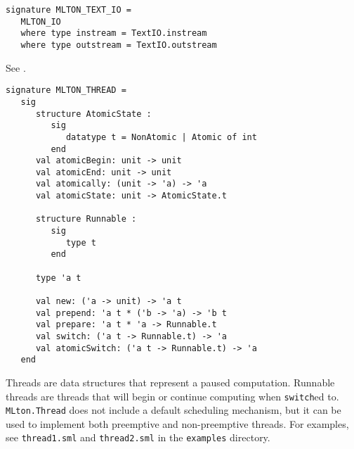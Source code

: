 \begin{verbatim}
signature MLTON_TEXT_IO =
   MLTON_IO
   where type instream = TextIO.instream
   where type outstream = TextIO.outstream
\end{verbatim}

See .


\begin{verbatim}
signature MLTON_THREAD =
   sig
      structure AtomicState :
         sig
            datatype t = NonAtomic | Atomic of int
         end
      val atomicBegin: unit -> unit
      val atomicEnd: unit -> unit
      val atomically: (unit -> 'a) -> 'a
      val atomicState: unit -> AtomicState.t

      structure Runnable :
         sig
            type t
         end

      type 'a t

      val new: ('a -> unit) -> 'a t
      val prepend: 'a t * ('b -> 'a) -> 'b t
      val prepare: 'a t * 'a -> Runnable.t
      val switch: ('a t -> Runnable.t) -> 'a
      val atomicSwitch: ('a t -> Runnable.t) -> 'a
   end
\end{verbatim}

Threads are data structures that represent a paused computation.
Runnable threads are threads that will begin or continue computing when
{\tt switch}ed to.  {\tt MLton.Thread} does not include a default
scheduling mechanism, but it can be used to implement both preemptive
and non-preemptive threads.  For examples, see {\tt thread1.sml} and
{\tt thread2.sml} in the {\tt examples} directory.

